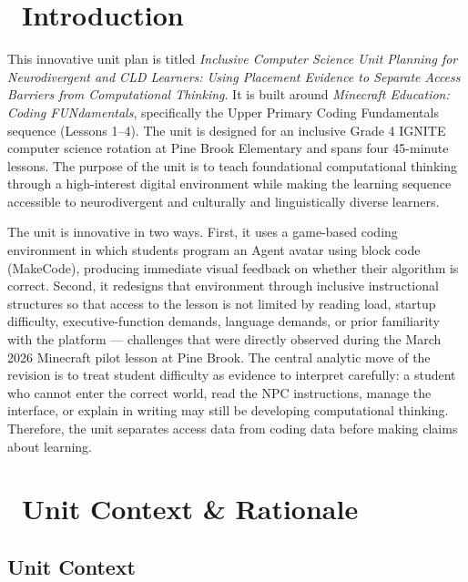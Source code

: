 \documentclass[12pt]{article}
\begin{document}
\section{\texorpdfstring{\faBook\ Introduction}{Introduction}}

This innovative unit plan is titled \emph{Inclusive Computer Science Unit Planning for Neurodivergent and CLD Learners: Using Placement Evidence to Separate Access Barriers from Computational Thinking}. It is built around \emph{Minecraft Education: Coding FUNdamentals}, specifically the Upper Primary Coding Fundamentals sequence (Lessons 1--4). The unit is designed for an inclusive Grade 4 IGNITE computer science rotation at Pine Brook Elementary and spans four 45-minute lessons. The purpose of the unit is to teach foundational computational thinking through a high-interest digital environment while making the learning sequence accessible to neurodivergent and culturally and linguistically diverse learners.

The unit is innovative in two ways. First, it uses a game-based coding environment in which students program an Agent avatar using block code (MakeCode), producing immediate visual feedback on whether their algorithm is correct. Second, it redesigns that environment through inclusive instructional structures so that access to the lesson is not limited by reading load, startup difficulty, executive-function demands, language demands, or prior familiarity with the platform --- challenges that were directly observed during the March 2026 Minecraft pilot lesson at Pine Brook. The central analytic move of the revision is to treat student difficulty as evidence to interpret carefully: a student who cannot enter the correct world, read the NPC instructions, manage the interface, or explain in writing may still be developing computational thinking. Therefore, the unit separates access data from coding data before making claims about learning.

\newpage
\section{\texorpdfstring{\faSchool\ Unit Context \& Rationale}{Unit Context and Rationale}}

\subsection{Unit Context}
\end{document}
